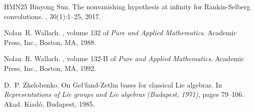 \documentclass[12pt, a4paper]{amsart}
\theoremstyle{Theorem}
\theoremstyle{Theorem}
\theoremstyle{Theorem}
\theoremstyle{Theorem}
\theoremstyle{Plain}
\theoremstyle{Definition}
\begin{document}
\begin{thebibliography}{HMN25}
		Binyong Sun.
		\newblock The nonvanishing hypothesis at infinity for {R}ankin-{S}elberg
		convolutions.
		, 30(1):1--25, 2017.
		
		Nolan~R. Wallach.
		, volume 132 of {\em Pure and Applied
			Mathematics}.
		\newblock Academic Press, Inc., Boston, MA, 1988.
		
		Nolan~R. Wallach.
		, volume 132-II of {\em Pure and
			Applied Mathematics}.
		\newblock Academic Press, Inc., Boston, MA, 1992.
		
		D.~P. Zhelobenko.
		\newblock On {G}el'fand-{Z}etlin bases for classical {L}ie algebras.
		\newblock In {\em Representations of {L}ie groups and {L}ie algebras
			({B}udapest, 1971)}, pages 79--106. Akad. Kiad\'o, Budapest, 1985.
		
	\end{thebibliography}
\end{document}
